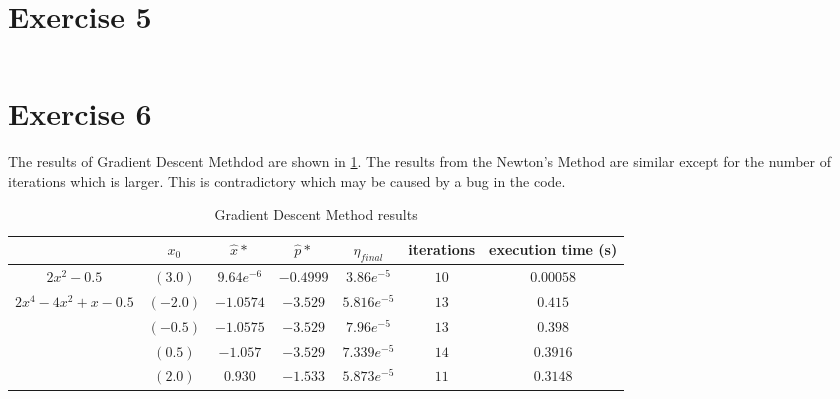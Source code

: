\documentclass[12pt, a4paper]{article}
\begin{document}

\newpage
\section*{Exercise 5}%
\label{sec:exercise_5}

\begin{listing}[H]
  \inputminted[breaklines=true,fontsize=\footnotesize]{python}{../exercise5.py}
  \label{lst:exercise5}
  \caption{}
\end{listing}


\newpage
\section*{Exercise 6}%
\label{sec:exercise_6}

The results of Gradient Descent Methdod are shown in \ref{table:exercise6}. The results from the Newton's Method are similar except for the number of iterations which is larger. This is contradictory which may be caused by a bug in the code.

\begin{table}[H]
\small
\hspace*{-1cm}\begin{tabular}{c|c|c|c|c|c|c}
                                     & $x_0$    & $\hat{x}*$   & $\hat{p}*$ & $\eta_{final}$      & iterations & execution time (s)\\ \hline
  $2x^2-0.5$                         & $(3.0)$  & $9.64e^{-6}$ & $-0.4999$  & $3.86e^{-5}$  & $10$       & $0.00058$      \\ \hline
  \multirow{4}{*}{$2x^4-4x^2+x-0.5$} & $(-2.0)$ & $-1.0574$    & $-3.529$   & $5.816e^{-5}$ & $13$       & $0.415$        \\ \cline{2-6}
                                     & $(-0.5)$ & $-1.0575$    & $-3.529$   & $7.96e^{-5}$  & $13$       & $0.398$        \\ \cline{2-6}
                                     & $(0.5)$  & $-1.057$     & $-3.529$   & $7.339e^{-5}$ & $14$       & $0.3916$       \\ \cline{2-6}
                                     & $(2.0)$  & $0.930$      & $-1.533$   & $5.873e^{-5}$ & $11$       & $0.3148$       \\
\end{tabular}
\label{table:exercise6}
  \caption{Gradient Descent Method results}
\end{table}
\end{document}
